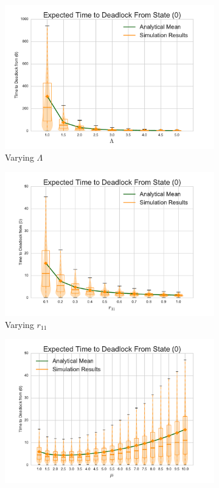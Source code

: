 \documentclass{article}
\begin{document}
\begin{figure}
\begin{subfigure}[b]{0.5\textwidth}
  \includegraphics[width=\textwidth]{images/varyL}
  \caption{Varying $\Lambda$}
  \label{fig:timestodeadlock_L}
\end{subfigure}
\begin{subfigure}[b]{0.5\textwidth}
  \includegraphics[width=\textwidth]{images/varyr11}
  \caption{Varying $r_{11}$}
  \label{fig:timestodeadlock_r11}
\end{subfigure}
\begin{subfigure}[b]{0.5\textwidth}
  \includegraphics[width=\textwidth]{images/varymu}

\end{subfigure}
\end{figure}
\end{document}
